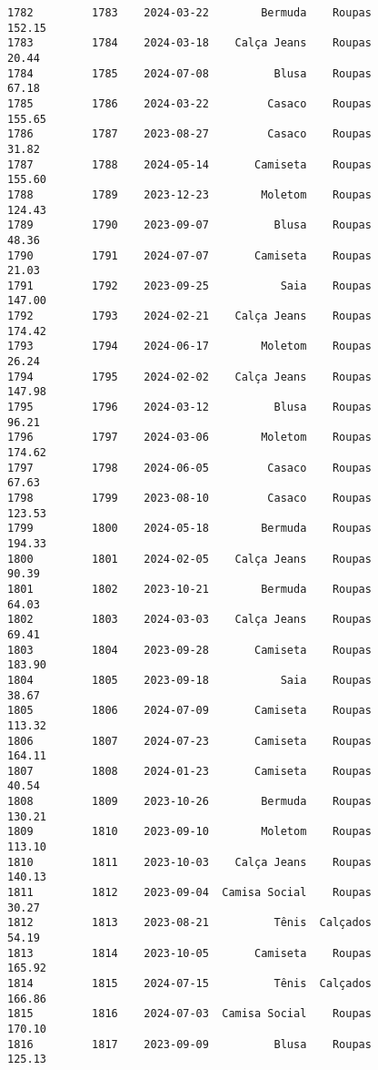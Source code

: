 \documentclass[11pt]{article}
\begin{document}
\begin{Verbatim}[commandchars=\\\{\}]
1782         1783    2024-03-22        Bermuda    Roupas          152.15   
1783         1784    2024-03-18    Calça Jeans    Roupas           20.44   
1784         1785    2024-07-08          Blusa    Roupas           67.18   
1785         1786    2024-03-22         Casaco    Roupas          155.65   
1786         1787    2023-08-27         Casaco    Roupas           31.82   
1787         1788    2024-05-14       Camiseta    Roupas          155.60   
1788         1789    2023-12-23        Moletom    Roupas          124.43   
1789         1790    2023-09-07          Blusa    Roupas           48.36   
1790         1791    2024-07-07       Camiseta    Roupas           21.03   
1791         1792    2023-09-25           Saia    Roupas          147.00   
1792         1793    2024-02-21    Calça Jeans    Roupas          174.42   
1793         1794    2024-06-17        Moletom    Roupas           26.24   
1794         1795    2024-02-02    Calça Jeans    Roupas          147.98   
1795         1796    2024-03-12          Blusa    Roupas           96.21   
1796         1797    2024-03-06        Moletom    Roupas          174.62   
1797         1798    2024-06-05         Casaco    Roupas           67.63   
1798         1799    2023-08-10         Casaco    Roupas          123.53   
1799         1800    2024-05-18        Bermuda    Roupas          194.33   
1800         1801    2024-02-05    Calça Jeans    Roupas           90.39   
1801         1802    2023-10-21        Bermuda    Roupas           64.03   
1802         1803    2024-03-03    Calça Jeans    Roupas           69.41   
1803         1804    2023-09-28       Camiseta    Roupas          183.90   
1804         1805    2023-09-18           Saia    Roupas           38.67   
1805         1806    2024-07-09       Camiseta    Roupas          113.32   
1806         1807    2024-07-23       Camiseta    Roupas          164.11   
1807         1808    2024-01-23       Camiseta    Roupas           40.54   
1808         1809    2023-10-26        Bermuda    Roupas          130.21   
1809         1810    2023-09-10        Moletom    Roupas          113.10   
1810         1811    2023-10-03    Calça Jeans    Roupas          140.13   
1811         1812    2023-09-04  Camisa Social    Roupas           30.27   
1812         1813    2023-08-21          Tênis  Calçados           54.19   
1813         1814    2023-10-05       Camiseta    Roupas          165.92   
1814         1815    2024-07-15          Tênis  Calçados          166.86   
1815         1816    2024-07-03  Camisa Social    Roupas          170.10   
1816         1817    2023-09-09          Blusa    Roupas          125.13   

\end{Verbatim}
\end{document}
